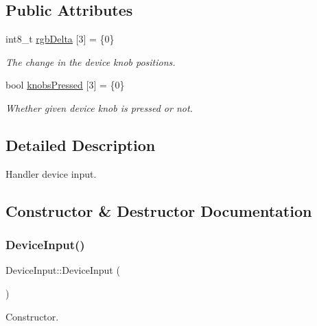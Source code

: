 \subsection*{Public Attributes}
\begin{DoxyCompactItemize}
\item 
\mbox{\label{classDeviceInput_a5f7accee89afc332b01714b772d05155}} 
int8\+\_\+t \mbox{\hyperlink{classDeviceInput_a5f7accee89afc332b01714b772d05155}{rgb\+Delta}} \mbox{[}3\mbox{]} = \{0\}
\begin{DoxyCompactList}\small\item\em The change in the device knob positions. \end{DoxyCompactList}\item 
\mbox{\label{classDeviceInput_ab0f8855487fd81e0d3796d9673dbf965}} 
bool \mbox{\hyperlink{classDeviceInput_ab0f8855487fd81e0d3796d9673dbf965}{knobs\+Pressed}} \mbox{[}3\mbox{]} = \{0\}
\begin{DoxyCompactList}\small\item\em Whether given device knob is pressed or not. \end{DoxyCompactList}\end{DoxyCompactItemize}


\subsection{Detailed Description}
Handler device input. 

\subsection{Constructor \& Destructor Documentation}
\mbox{\label{classDeviceInput_a5a5d144c0a4a2d0fedfd85fcb687a716}} 
\subsubsection{\texorpdfstring{Device\+Input()}{DeviceInput()}}
{\footnotesize\ttfamily Device\+Input\+::\+Device\+Input (\begin{DoxyParamCaption}{ }\end{DoxyParamCaption})}

Constructor. \mbox{\label{classDeviceInput_a6c06d020cca58b3d4763e1717382b1a8}} 
